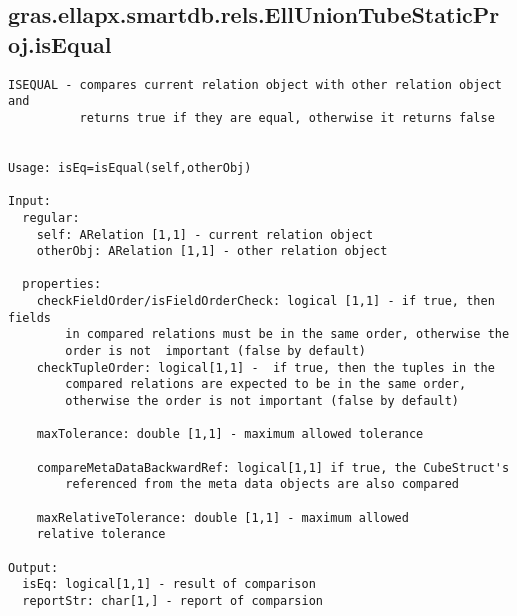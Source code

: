 \subsection{\texorpdfstring{gras.ellapx.smartdb.rels.EllUnionTubeStaticProj.isEqual}{isEqual}}\label{method:gras.ellapx.smartdb.rels.EllUnionTubeStaticProj.isEqual}
\begin{verbatim}
ISEQUAL - compares current relation object with other relation object and
          returns true if they are equal, otherwise it returns false


Usage: isEq=isEqual(self,otherObj)

Input:
  regular:
    self: ARelation [1,1] - current relation object
    otherObj: ARelation [1,1] - other relation object

  properties:
    checkFieldOrder/isFieldOrderCheck: logical [1,1] - if true, then fields
        in compared relations must be in the same order, otherwise the
        order is not  important (false by default)
    checkTupleOrder: logical[1,1] -  if true, then the tuples in the
        compared relations are expected to be in the same order,
        otherwise the order is not important (false by default)

    maxTolerance: double [1,1] - maximum allowed tolerance

    compareMetaDataBackwardRef: logical[1,1] if true, the CubeStruct's
        referenced from the meta data objects are also compared

    maxRelativeTolerance: double [1,1] - maximum allowed
    relative tolerance

Output:
  isEq: logical[1,1] - result of comparison
  reportStr: char[1,] - report of comparsion
\end{verbatim}
